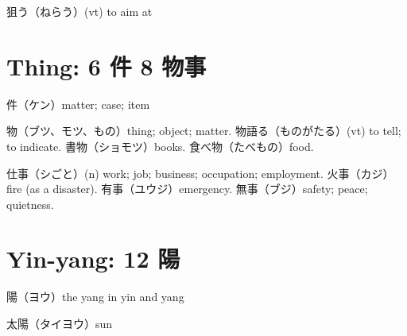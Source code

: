 狙う（ねらう）(vt) to aim at

\section{Thing: 6 件 8 物事}

件（ケン）matter; case; item

物（ブツ、モツ、もの）thing; object; matter.
物語る（ものがたる）(vt) to tell; to indicate.
書物（ショモツ）books.
食べ物（たべもの）food.

仕事（シごと）(n) work; job; business; occupation; employment.
火事（カジ）fire (as a disaster).
有事（ユウジ）emergency.
無事（ブジ）safety; peace; quietness.

\section{Yin-yang: 12 陽}

陽（ヨウ）the yang in yin and yang

太陽（タイヨウ）sun
